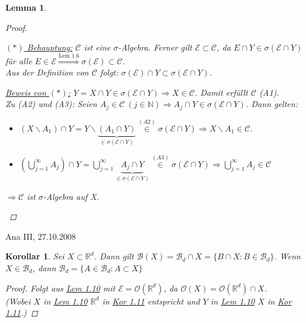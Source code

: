 \documentclass[a4paper]{scrreprt}
\newcommand{\R}{\mathbb{R}}
\newcommand{\N}{\mathbb{N}}
\newcommand{\Borel}{\mathcal{B}}
\newcommand{\Bd}{\Borel_d}
\newcommand{\jlabel}[1]{\label{j_#1}}
\newcommand{\jshortlink}[1]{\jhyperref{#1}{\text{#1}}}
\newcommand{\jhyperref}[2]{\hyperref[j_#1]{#2}}
\newcommand{\jlink}[1]{\jhyperref{#1}{#1}}
\newcommand{\jspacesmall}{\vspace{4pt}}
\newcommand{\jdate}[1]{\jspacesmall\begin{center}\jlabel{#1}\tiny{Ana III, #1}\end{center}}
\theoremstyle{plain}
\newtheorem{lem}[thm]{Lemma}
\newtheorem{kor}[thm]{Korollar}
\theoremstyle{definition}
\begin{document}
{{\begin{lem}
\begin{proof}
\begin{enumerate}
                \jspacesmall
                
                \uline{$(*)$ Behauptung:} $\mathcal{C}$ ist eine $\sigma$-Algebra. Ferner gilt $\mathcal{E} \subset \mathcal{C}$, da $E \cap Y \in \sigma(\mathcal{E} \cap Y)$ für alle $E \in \mathcal{E} \overset{\jshortlink{Lem 1.6}}{\Rightarrow} \sigma(\mathcal{E}) \subset \mathcal{C}$.\\
                Aus der Definition von $\mathcal{C}$ folgt: $\sigma(\mathcal{E}) \cap Y \subset \sigma(\mathcal{E} \cap Y)$.
                
                \jspacesmall
                
                \uline{Beweis von $(*)$:}
                $Y = X \cap Y \in \sigma(\mathcal{E} \cap Y) \Rightarrow X \in \mathcal{C}$. Damit erfüllt $\mathcal{C}$ (A1).\\
                Zu (A2) und (A3): Seien $A_j \in \mathcal{C} \ (j \in \N) \Rightarrow A_j \cap Y \in \sigma(\mathcal{E} \cap Y)$. Dann gelten:
                \begin{itemize}
                    \item $(X\backslash A_1) \cap Y = Y \backslash \underbrace{(A_1 \cap Y)}_{\in \sigma(\mathcal{E} \cap Y)} \overset{(A2)}{\in} \sigma(\mathcal{E} \cap Y) \Rightarrow X \backslash A_1 \in \mathcal{C}$.
                    \item $(\bigcup_{j=1}^{\infty} A_j) \cap Y = \bigcup_{j=1}^\infty \underbrace{A_j \cap Y}_{\in \sigma(\mathcal{E} \cap Y)} \overset{(A3)}{\in} \sigma(\mathcal{E} \cap Y) \Rightarrow \bigcup_{j=1}^\infty A_j \in \mathcal{C}$
                \end{itemize}
                $\Rightarrow \mathcal{C}$ ist $\sigma$-Algebra auf X.
        \end{enumerate}

    \end{proof}
\end{lem}

\jdate{27.10.2008}

\begin{kor}
\jlabel{Kor 1.11}
    Sei $X \subset \R^d$. Dann gilt $\Borel(X) = \Bd \cap X = \{B \cap X : B \in \Bd\}$.
    Wenn $X \in \Bd$, dann $\Bd = \{A\in \Bd : A \subset X\}$
    \begin{proof}
        Folgt aus \jlink{Lem 1.10} mit $\mathcal{E} = \mathcal{O}(\R^d)$, da $\mathcal{O}(X) = \mathcal{O}(\R^d) \cap X$.\\
        (Wobei $X$ in \jlink{Lem 1.10} $\R^d$ in \jlink{Kor 1.11} entspricht und $Y$ in \jlink{Lem 1.10} $X$ in \jlink{Kor 1.11}.)
    \end{proof}
\end{kor}

}}
\end{document}
